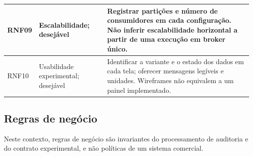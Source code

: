 {\begin{longtable}{>{\raggedright\arraybackslash}p{}>{\raggedright\arraybackslash}p{}>{\raggedright\arraybackslash}p{}}
RNF09 & Escalabilidade; desejável & Registrar partições e número de consumidores em cada configuração. Não inferir escalabilidade horizontal a partir de uma execução em broker único.\\ \hline
RNF10 & Usabilidade experimental; desejável & Identificar a variante e o estado dos dados em cada tela; oferecer mensagens legíveis e unidades. Wireframes não equivalem a um painel implementado.\\ \hline
\end{longtable}
\par
}

\subsection{Regras de negócio}
Neste contexto, regras de negócio são invariantes do processamento de auditoria e do contrato experimental, e não políticas de um sistema comercial.

